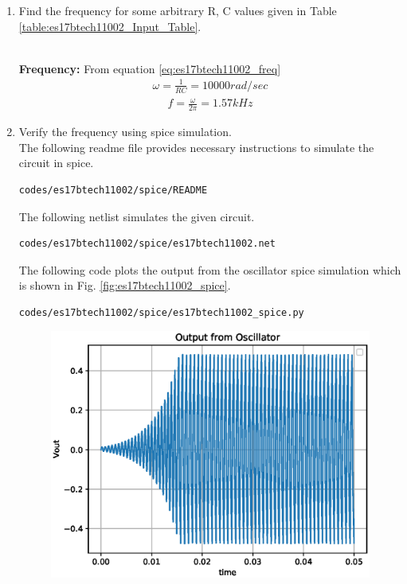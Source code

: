 \begin{enumerate}[label=\arabic*.,ref=\theenumi]
\begin{figure}[!ht]
\caption{}
\label{fig:es17btech11002_fig8}
\end{figure}
%
\item Find the frequency for some arbitrary R, C values given in Table \ref{table:es17btech11002_Input_Table}.\\
\begin{table}[!ht]
\centering

\caption{}
\label{table:es17btech11002_Input_Table}
\end{table}
\\
\solution 
%
\textbf{Frequency:} From equation \eqref{eq:es17btech11002_freq}
\begin{align}
\omega = \frac{1}{RC} = 10000 rad/sec
\end{align}
\begin{align}
f = \frac{\omega }{2\pi} = 1.57 kHz
\end{align}
\item Verify the frequency using spice simulation.\\
\solution The following readme file provides necessary instructions to simulate the circuit in spice.
\begin{lstlisting}
codes/es17btech11002/spice/README
\end{lstlisting}
The following netlist simulates the given circuit.
\begin{lstlisting}
codes/es17btech11002/spice/es17btech11002.net
\end{lstlisting}
The following code plots the output from the oscillator spice simulation which is shown in Fig. \ref{fig:es17btech11002_spice}.
\begin{lstlisting}
codes/es17btech11002/spice/es17btech11002_spice.py
\end{lstlisting}
\renewcommand{\thefigure}{\theenumi.\arabic{figure}}
%
\begin{figure}[!ht]
\centering
\includegraphics[width=\columnwidth]{./figs/es17btech11002/es17btech11002_spice.eps}

\end{figure}
\end{enumerate}

